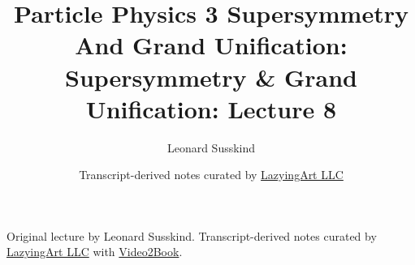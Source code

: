 \documentclass[11pt,oneside]{book}
\begin{document}
\frontmatter
\title{Particle Physics 3 Supersymmetry And Grand Unification: Supersymmetry \& Grand Unification: Lecture 8}
\author{Leonard Susskind}
\date{Transcript-derived notes curated by \href{https://lazying.art}{LazyingArt LLC}}
\maketitle
\begin{center}
\small Original lecture by Leonard Susskind. Transcript-derived notes curated by \href{https://lazying.art}{LazyingArt LLC} with \href{https://github.com/lachlanchen/Video2Book}{Video2Book}.
\end{center}
\clearpage
\mainmatter

\end{document}
